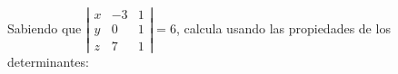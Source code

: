 \documentclass[addpoints,spanish, 12pt,a4paper]{exam}
\begin{document}
\begin{questions}

\question Sabiendo que $\left|\begin{matrix}x & -3 & 1\\y & 0 & 1\\z & 7 & 1\end{matrix}\right|=6$, calcula usando las propiedades de los determinantes:
\begin{parts}

\end{parts}
\end{questions}
\end{document}
